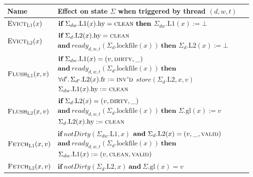 \documentclass[svgnames,10pt]{sigplanconf}
\makeatletter
\theoremstyle{definition}
\newcommand\tstack[2][l]{\renewcommand\arraystretch{1}\begin{tabular}[t]{@{}#1@{}}#2\end{tabular}}
\newcommand\var[1]{\mathit{#1}}
\newcommand\IF{\textbf{if}}
\newcommand\THEN{\textbf{then}}
\newcommand\DIRTY{\textsc{dirty}}
\newcommand\CLEAN{\textsc{clean}}
\newcommand\VALID{\textsc{valid}}
\newcommand\INVALID{\textsc{inv'd}}
\newcommand\ACTevict[1]{\textsc{Evict$_{\textsc{L#1}}$}}
\newcommand\ACTflush[1]{\textsc{Flush$_{\textsc{L#1}}$}}
\newcommand\ACTfetch[1]{\textsc{Fetch$_{\textsc{L#1}}$}}
\makeatother
\begin{document}
\begin{table}
\centering
\setlength{\tabcolsep}{1.0mm}
\renewcommand\arraystretch{1.5}
\begin{tabular}{ll}
\hline
{}
Name & \tstack{Effect on state $\Sigma$ when \\ triggered by thread $(d,w,t)$} \\
\hline
{}$\ACTevict1(x)$ & \tstack{$\IF~\Sigma_{dw}. \mathrm{L1}(x).\mathrm{hy} =
\CLEAN~\THEN$ \\ 
\quad$\Sigma_{dw}. \mathrm{L1}(x) := \bot$
} \\
\hline
{}$\ACTevict2(x)$ & \tstack{$\IF~\Sigma_{d}. \mathrm{L2}(x).\mathrm{hy} =
\CLEAN$ \\ $\textbf{and}~\var{ready}_{d,w,t}(\Sigma_{d}.\mathrm{lockfile}(x))~\THEN$ \\
\quad$\Sigma_{d}. \mathrm{L2}(x) := \bot$} \\
\hline
{}$\ACTflush1(x,v)$ & \tstack{$\IF~\Sigma_{dw}.\mathrm{L1}(x) = (v,
\DIRTY,\_)$\\ $\textbf{and}~\var{ready}_{d,w,t}(\Sigma_{d}.\mathrm{lockfile}(x))~\THEN$ \\ 
\quad$\forall d'\ldotp
\Sigma_{d'}.\mathrm{L2}(x).\mathrm{fr} := \INVALID$ \\
\quad$\var{store}(\Sigma_{d}.\mathrm{L2},x,v)$ \\
\quad$\Sigma_{dw}. \mathrm{L1}(x).\mathrm{hy} := \CLEAN$}\\
\hline
{}$\ACTflush2(x,v)$ & \tstack{$\IF~\Sigma_{d}.\mathrm{L2}(x) = (v,
\DIRTY,\_)$\\ $\textbf{and}~\var{ready}_{d,w,t}(\Sigma_{d}.\mathrm{lockfile}(x))~\THEN$ \\ \quad$\Sigma.\mathrm{gl}(x) := v$ \\ \quad$\Sigma_{d}. \mathrm{L2}(x).\mathrm{hy} := \CLEAN$}\\
\hline
{}$\ACTfetch1(x,v)$ &
\tstack{$\IF~\var{notDirty}(\Sigma_{dw}.\mathrm{L1},x)$\\ $\textbf{and}~\Sigma_{d}.\mathrm{L2}(x) = (v,\_,\VALID)$\\
$\textbf{and}~\var{ready}_{d,w,t}(\Sigma_{d}.\mathrm{lockfile}(x))~\THEN$\\\quad$\Sigma_{dw}.\mathrm{L1}(x) := (v,\CLEAN,\VALID)$}\\
\hline
{}$\ACTfetch2(x,v)$ &
\tstack{$\IF~\var{notDirty}(\Sigma_{d}.\mathrm{L2},x)~\textbf{and}~\Sigma.\mathrm{gl}(x) = v$\\
}
\end{tabular}
\end{table}
\end{document}
